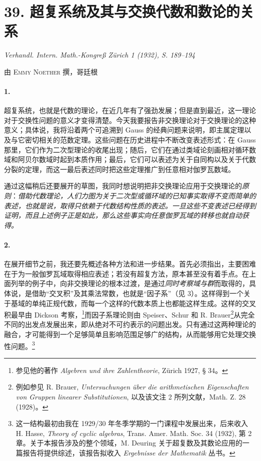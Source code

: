 \section*{39. 超复系统及其与交换代数和数论的关系}

\begin{center}
\emph{Verhandl. Intern. Math.-Kongreß Zürich 1 (1932), S. 189--194}
\end{center}

\begin{center}
\textsc{由 Emmy Noether 撰，哥廷根}
\end{center}

\paragraph{1.}
超复系统，也就是代数的理论，在近几年有了强劲发展；但是直到最近，这一理论对于交换性问题的意义才变得清楚。今天我要报告非交换理论对于交换理论的这种意义；具体说，我将沿着两个可追溯到 Gauss 的经典问题来说明，即主属定理以及与它密切相关的范数定理。这些问题在历史进程中不断改变表述形式：在 Gauss 那里，它们作为二次型理论的收尾出现；随后，它们在通过类域论刻画相对循环数域和阿贝尔数域时起到本质作用；最后，它们可以表述为关于自同构以及关于代数分裂的定理，而这一最后表述同时把这些定理推广到任意相对伽罗瓦数域。

通过这幅稍后还要展开的草图，我同时想说明把非交换理论应用于交换理论的\emph{原则}：\emph{借助代数理论，人们力图为关于二次型或循环域的已知事实取得不变而简单的表述，也就是说，取得只依赖于代数结构性质的表述。一旦这些不变表述已经得到证明，而且上述例子正是如此，那么这些事实向任意伽罗瓦域的转移也就自动获得。}

\paragraph{2.}
在展开细节之前，我还要先概述各种方法和进一步结果。首先必须指出，主要困难在于为一般伽罗瓦域取得相应表述；若没有超复方法，原本甚至没有着手点。在上面列举的例子中，向非交换理论的根本过渡，是通过\emph{同时考察域与群}而取得的，具体说，是借助“交叉积”及其乘法常数，也就是“因子系”（见 3）。这样得到一个关于基域的单纯正规代数，而每一个这样的代数本质上也都能这样生成。这样的交叉积最早由 Dickson 考察，\footnote{参见他的著作 \emph{Algebren und ihre Zahlentheorie}, Zürich 1927, § 34。}而因子系理论则由 Speiser、Schur 和 R. Brauer\footnote{例如参见 R. Brauer, \emph{Untersuchungen über die arithmetischen Eigenschaften von Gruppen linearer Substitutionen}, 以及该文注 2 所列文献，Math. Z. 28 (1928)。}从完全不同的出发点发展出来，即从绝对不可约表示的问题出发。只有通过这两种理论的融合，才可能得到一个足够简单且影响范围足够广的结构，从而能够用它处理交换性问题。\footnote{这一结构最初由我在 1929/30 年冬季学期的一门课程中发展出来，后来收入 H. Hasse, \emph{Theory of cyclic algebras}, Trans. Amer. Math. Soc. 34 (1932), 第 2 章。关于本报告涉及的整个领域，M. Deuring 关于超复数及其数论应用的一篇报告将提供综述，该报告拟收入 \emph{Ergebnisse der Mathematik} 丛书。}

